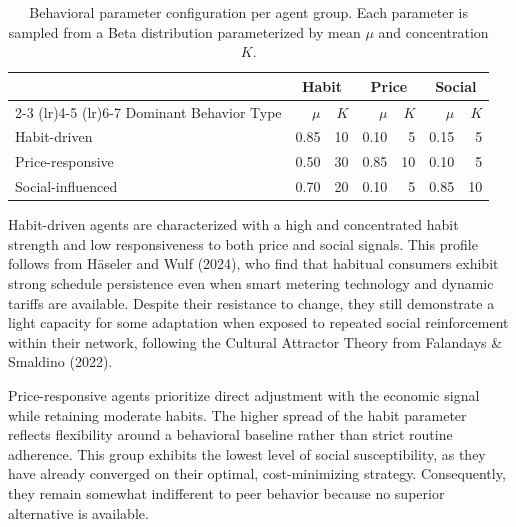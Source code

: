 \documentclass[11pt, a4paper]{article}
\begin{document}
\begin{table}
    \caption{Behavioral parameter configuration per agent group. Each parameter is sampled from a Beta distribution parameterized by mean $\mu$ and concentration $K$.}
    \label{tab:behavioral_params}
    \centering
    \small
    \begin{tabular}{lrrrrrr}
        \toprule
                                  & \multicolumn{2}{c}{Habit}   & \multicolumn{2}{c}{Price}   & \multicolumn{2}{c}{Social}  \\
                                    \cmidrule(lr){2-3}             \cmidrule(lr){4-5}             \cmidrule(lr){6-7}
        Dominant Behavior Type    & $\mu$  & $K$                 & $\mu$  & $K$                 & $\mu$  & $K$                 \\
        \midrule
        Habit-driven              & 0.85   & 10                  & 0.10   & 5                   & 0.15   & 5                   \\
        \midrule
        Price-responsive          & 0.50   & 30                  & 0.85   & 10                  & 0.10   & 5                   \\
        \midrule
        Social-influenced         & 0.70   & 20                  & 0.10   & 5                   & 0.85   & 10                  \\
        \bottomrule
    \end{tabular}
\end{table}
Habit-driven agents are characterized with a high and concentrated habit strength and low responsiveness to both price and social signals. This profile follows from Häseler and Wulf (2024), who find that habitual consumers exhibit strong schedule persistence even when smart metering technology and dynamic tariffs are available. Despite their resistance to change, they still demonstrate a light capacity for some adaptation when exposed to repeated social reinforcement within their network, following the Cultural Attractor Theory from Falandays \& Smaldino (2022).

Price-responsive agents prioritize direct adjustment with the economic signal while retaining moderate habits. The higher spread of the habit parameter reflects flexibility around a behavioral baseline rather than strict routine adherence. This group exhibits the lowest level of social susceptibility, as they have already converged on their optimal, cost-minimizing strategy. Consequently, they remain somewhat indifferent to peer behavior because no superior alternative is available.
\end{document}
